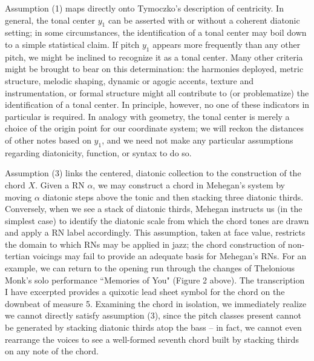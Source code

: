 Assumption (1) maps directly onto Tymoczko's description of centricity.  In general, the tonal center $y_1$ can be asserted with or without a coherent diatonic setting; in some circumstances, the identification of a tonal center may boil down to a simple statistical claim.  If pitch $y_1$ appears more frequently than any other pitch, we might be inclined to recognize it as a tonal center.  Many other criteria might be brought to bear on this determination: the harmonies deployed, metric structure, melodic shaping, dynamic or agogic accents, texture and instrumentation, or formal structure might all contribute to (or problematize) the identification of a tonal center.  In principle, however, no one of these indicators in particular is required.  In analogy with geometry, the tonal center is merely a choice of the origin point for our coordinate system; we will reckon the distances of other notes based on $y_1$, and we need not make any particular assumptions regarding diatonicity, function, or syntax to do so.

Assumption (3) links the centered, diatonic collection to the construction of the chord $X$.  Given a RN $\alpha$, we may construct a chord in Mehegan's system by moving $\alpha$ diatonic steps above the tonic and then stacking three diatonic thirds.  Conversely, when we see a stack of diatonic thirds, Mehegan instructs us (in the simplest case) to identify the diatonic scale from which the chord tones are drawn and apply a RN label accordingly.  This assumption, taken at face value, restricts the domain to which RNs may be applied in jazz; the chord construction of non-tertian voicings may fail to provide an adequate basis for Mehegan's RNs.  For an example, we can return to the opening run through the changes of Thelonious Monk's solo performance ``Memories of You" (Figure 2 above).  The transcription I have excerpted provides a quixotic lead sheet symbol for the chord on the downbeat of measure 5.  Examining the chord in isolation, we immediately realize we cannot directly satisfy assumption (3), since the pitch classes present cannot be generated by stacking diatonic thirds atop the bass -- in fact, we cannot even rearrange the voices to see a well-formed seventh chord built by stacking thirds on any note of the chord.

